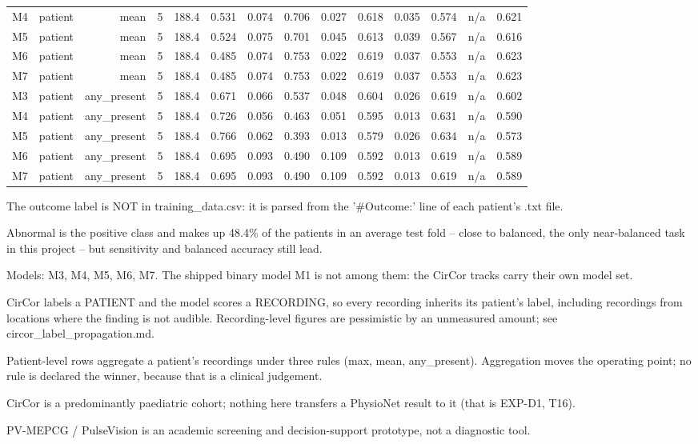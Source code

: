 \begin{table}[htbp]
\begin{tabular}{lrrrrrrrrrrrrr}
    M4 & patient & mean & 5 & 188.4 & 0.531 & 0.074 & 0.706 & 0.027 & 0.618 & 0.035 & 0.574 & n/a & 0.621 \\
    M5 & patient & mean & 5 & 188.4 & 0.524 & 0.075 & 0.701 & 0.045 & 0.613 & 0.039 & 0.567 & n/a & 0.616 \\
    M6 & patient & mean & 5 & 188.4 & 0.485 & 0.074 & 0.753 & 0.022 & 0.619 & 0.037 & 0.553 & n/a & 0.623 \\
    M7 & patient & mean & 5 & 188.4 & 0.485 & 0.074 & 0.753 & 0.022 & 0.619 & 0.037 & 0.553 & n/a & 0.623 \\
    M3 & patient & any\_present & 5 & 188.4 & 0.671 & 0.066 & 0.537 & 0.048 & 0.604 & 0.026 & 0.619 & n/a & 0.602 \\
    M4 & patient & any\_present & 5 & 188.4 & 0.726 & 0.056 & 0.463 & 0.051 & 0.595 & 0.013 & 0.631 & n/a & 0.590 \\
    M5 & patient & any\_present & 5 & 188.4 & 0.766 & 0.062 & 0.393 & 0.013 & 0.579 & 0.026 & 0.634 & n/a & 0.573 \\
    M6 & patient & any\_present & 5 & 188.4 & 0.695 & 0.093 & 0.490 & 0.109 & 0.592 & 0.013 & 0.619 & n/a & 0.589 \\
    M7 & patient & any\_present & 5 & 188.4 & 0.695 & 0.093 & 0.490 & 0.109 & 0.592 & 0.013 & 0.619 & n/a & 0.589 \\
    \bottomrule
  \end{tabular}
  \par\footnotesize The outcome label is NOT in training\_data.csv: it is parsed from the '\#Outcome:' line of each patient's .txt file.
  \par\footnotesize Abnormal is the positive class and makes up 48.4\% of the patients in an average test fold -- close to balanced, the only near-balanced task in this project -- but sensitivity and balanced accuracy still lead.
  \par\footnotesize Models: M3, M4, M5, M6, M7. The shipped binary model M1 is not among them: the CirCor tracks carry their own model set.
  \par\footnotesize CirCor labels a PATIENT and the model scores a RECORDING, so every recording inherits its patient's label, including recordings from locations where the finding is not audible. Recording-level figures are pessimistic by an unmeasured amount; see circor\_label\_propagation.md.
  \par\footnotesize Patient-level rows aggregate a patient's recordings under three rules (max, mean, any\_present). Aggregation moves the operating point; no rule is declared the winner, because that is a clinical judgement.
  \par\footnotesize CirCor is a predominantly paediatric cohort; nothing here transfers a PhysioNet result to it (that is EXP-D1, T16).
  \par\footnotesize PV-MEPCG / PulseVision is an academic screening and decision-support prototype, not a diagnostic tool.
\end{table}
